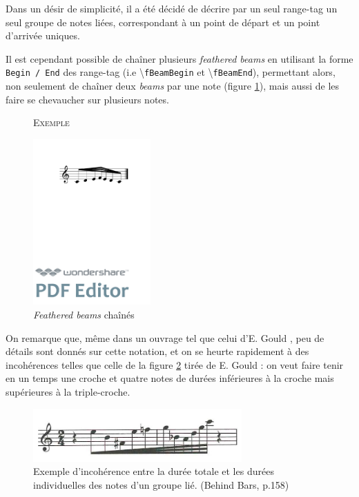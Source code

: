 \documentclass{article}
\newenvironment{gmncode}	{\vspace{-2mm}\small\verbatim}{\endverbatim\vspace{-2mm}}
\newcommand{\code}[1]		{{\small \texttt{#1}}}
\newcommand{\guidotag}[1]	{\textbackslash\code{#1}}
\newcommand{\exemple}		{\vspace{2mm}\hspace*{-6mm}\textsc{Exemple}}
\begin{document}
Dans un désir de simplicité, il a été décidé de décrire par un seul range-tag un seul groupe de notes liées, correspondant à un point de départ et un point d'arrivée uniques.

Il est cependant possible de chaîner plusieurs \emph{feathered beams} en utilisant la forme \code{Begin / End} des range-tag (i.e \guidotag{fBeamBegin} et \guidotag{fBeamEnd}), permettant alors, non seulement de chaîner deux \emph{beams} par une note (figure \ref{fig:fbeamchain}), mais aussi de les faire se chevaucher sur plusieurs notes.

\begin{figure}[h]
\exemple
\begin{gmncode}
[ 
  \fBeamBegin:1 c/8 d e/16 
  \fBeamBegin:2 f/32 \fBeamEnd:1 
  e/16 d/8 c \fBeamEnd:2 
]
\end{gmncode}

\begin{center}
\includegraphics[width=45mm]{img/fBeamChaine.pdf}
\end{center}
\caption{\emph{Feathered beams} chaînés}
\label{fig:fbeamchain}
\end{figure}

\bigskip
On remarque que, même dans un ouvrage tel que celui d'E. Gould \cite{gould2011behind}, peu de détails sont donnés sur cette notation, et on se heurte rapidement à des incohérences telles que celle de la figure \ref{fig:incoherence} tirée de E. Gould \cite{gould2011behind} : on veut faire tenir en un temps une croche et quatre notes de durées inférieures à la croche mais supérieures à la triple-croche. 

\begin{figure}[h]
\centering
\includegraphics[width=8cm]{img/behindbars.jpg}
\caption{Exemple d'incohérence entre la durée totale et les durées individuelles des notes d'un groupe lié. (Behind Bars, p.158) }
\label{fig:incoherence}
\end{figure}
\end{document}
